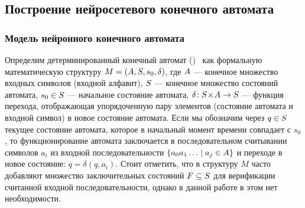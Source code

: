 %
%
%
%


\subsection{Построение нейросетевого конечного автомата}



\subsubsection{Модель нейронного конечного автомата}

Определим детерминированный конечный автомат ()~\cite{Hopcroft2008} как формальную математическую структуру $M = \left( A, S, s_{0}, \delta \right)$, где $A$ --- конечное множество входных символов (входной алфавит), $S$ --- конечное множество состояний автомата, $s_{0} \in S$ --- начальное состояние автомата, $\delta\!: S\!\times\!A \to S$ --- функция перехода, отображающая упорядоченную пару элементов (состояние автомата и входной символ) в новое состояние автомата. Если мы обозначим через $q \in S$ текущее состояние автомата, которое в начальный момент времени совпадает с $s_{0}$, то функционирование автомата заключается в последовательном считывании символов $a_{i}$ из входной последовательности $\left\{ a_{0} a_{1} \ldots \mid a_{j} \in A \right\}$ и переходе в новое состояние: $q = \delta \left( q, a_{i} \right)$. Стоит отметить, что в структуру $M$ часто добавляют множество \socalled заключительных состояний $F \subseteq S$ для верификации считанной входной последовательности, однако в данной работе в этом нет необходимости.

